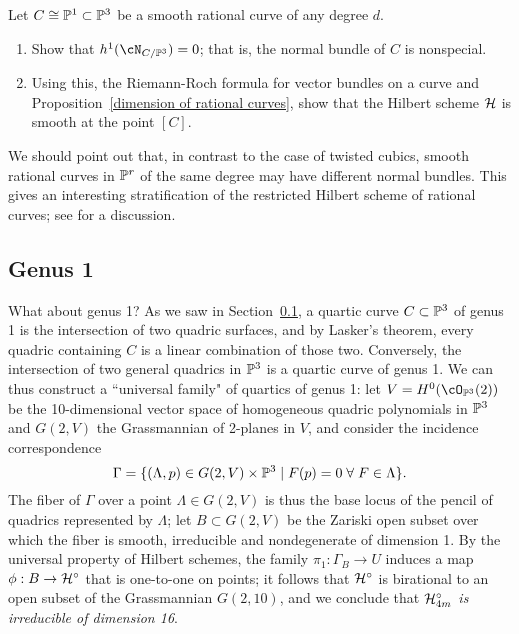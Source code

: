 \begin{exercise}
Let $C \cong \PP^1 \subset \PP^3$ be a smooth rational curve of any degree $d$. 
\begin{enumerate}
\item Show that $h^1(\cN_{C/\PP^3}) = 0$; that is, the normal bundle of $C$ is nonspecial.
\item Using this, the Riemann-Roch formula for vector bundles on a curve and Proposition~\ref{dimension of rational curves}, show that the Hilbert scheme $\cH$ is smooth at the point $[C]$.
\end{enumerate} 
\end{exercise}

We should point out that, in contrast to the case of twisted cubics, smooth rational curves in $\PP^r$ of the same degree may have different normal bundles. This gives an interesting stratification of the restricted Hilbert scheme of rational curves; see \cite{Riedl paper?} for a discussion.

\subsection{Genus 1}
What about genus 1? As we saw in Section~\ref{}, a quartic curve $C \subset \PP^3$ of genus 1 is the intersection of two quadric surfaces, and by Lasker's theorem, every quadric containing $C$ is a linear combination of those two. Conversely, the intersection of two general quadrics in $\PP^3$ is a quartic curve of genus 1. We can thus construct a ``universal family" of quartics of genus 1: let $V = H^0(\cO_{\PP^3}(2))$ be the 10-dimensional vector space of homogeneous quadric polynomials in $\PP^3$ and $G(2,V)$ the Grassmannian of 2-planes in $V$, and consider the incidence correspondence
$$
\Gamma = \{ (\Lambda, p) \in G(2,V) \times \PP^3 \mid F(p)=0 \; \forall \; F \in \Lambda \}.
$$
The fiber of $\Gamma$ over a point $\Lambda \in G(2,V)$ is thus the base locus of the pencil of quadrics represented by $\Lambda$; let $B \subset G(2,V)$ be the Zariski open subset over which the fiber is smooth, irreducible and nondegenerate of dimension 1. By the universal property of Hilbert schemes, the family $\pi_1 : \Gamma_B \to U$ induces a map $\phi : B \to \cH^\circ$ that is one-to-one on points; it follows that $\cH^\circ$ is birational to an open subset of the Grassmannian $G(2,10)$, and we conclude that \emph{$\cH^\circ_{4m}$ is irreducible of dimension 16}.

